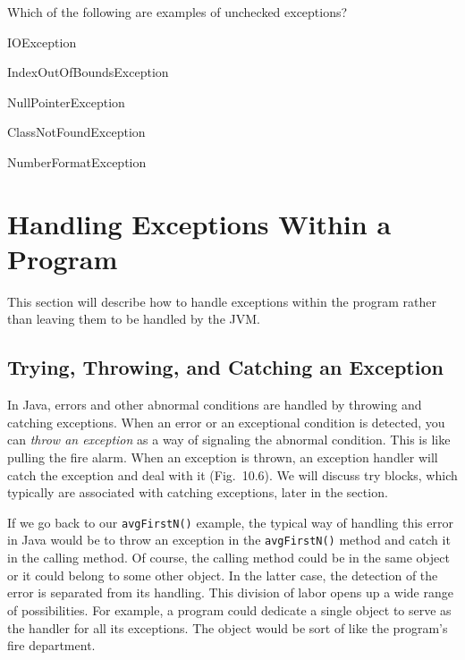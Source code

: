 \begin{SSTUDY}

\item  Which of the following are examples 
of unchecked \mbox{exceptions?}

\begin{EXRLL}
\item  IOException                 
\item  IndexOutOfBoundsException   
\item  NullPointerException        
\item  ClassNotFoundException      
\item  NumberFormatException       
\end{EXRLL}

\end{SSTUDY}

\section{Handling Exceptions Within a Program}
\noindent This section will describe how to handle exceptions
within the program rather than leaving them to be
handled by the JVM. 

\subsection{Trying, Throwing, and Catching an Exception}
\noindent In Java, errors and other abnormal conditions are handled by throwing
 and catching exceptions.
When an error or an exceptional condition is detected, you can {\em
throw an exception} as a way of signaling
the abnormal condition.  This is like pulling the fire alarm.  When an
exception is thrown, an exception handler will catch the exception and
deal with it (Fig.~10.6). We will discuss try blocks, which typically
are associated with catching exceptions, later in the section.


If we go back to our {\tt avgFirstN()} example, the typical way of
handling this error in Java would be to throw an exception in
the \mbox{\tt avgFirstN()} method and catch it in the calling method.
Of course, the calling method could be in the same object or it could
belong to some other object. In the latter case, the detection of the
error is separated from its handling.  This division of labor opens up
a wide range of possibilities.  For example, a program could dedicate
a single object to serve as the handler for all its exceptions.  The
object would be sort of like the program's fire department.

